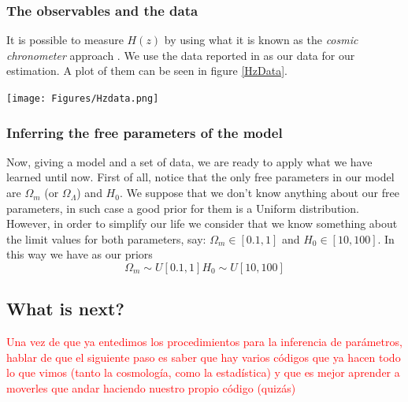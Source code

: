 \documentclass[onecolumn,           %
               showpacs,            %
               preprintnumbers,     %
               aps,                 %
               prl,          	    %
               letterpaper,             %
               superscriptaddress,      %
               nofootinbib,         %
               tightenlines,        %
               floats,floatfix      %
               ,usenatbib,
               ]{revtex4-1}
\begin{document}
\subsubsection{The observables and the data}

It is possible to measure $H(z)$ by using what it is known as the \textit{cosmic chronometer} approach \cite{Hz}. We use the data reported in \cite{Hzdata} as our data for our estimation. A plot of them can be seen in figure \ref{HzData}.

\begin{minipage}{\textwidth}
\centering
\texttt{[image: Figures/Hzdata.png]}
\label{HzData}
\end{minipage}

\subsubsection{Inferring the free parameters of the model}

Now, giving a model and a set of data, we are ready to apply what we have learned until now. First of all, notice that the only free parameters in our model are $\Omega_m$ (or $\Omega_\Lambda$) and $H_0$. We suppose that we don't know anything about our free parameters, in such case a good prior for them is a Uniform distribution. However, in order to simplify our life we consider that we know something about the limit values for both parameters,  say: $\Omega_m\in [0.1,1]$ and $H_0\in [10,100]$. In this way we have as our priors
\begin{subequations}
\begin{equation}
\Omega_m\sim U[0.1,1]
\end{equation}
\begin{equation}
H_0\sim U[10,100]
\end{equation}
\end{subequations} 
\subsection{What is next?}

\textcolor{red}{Una vez de que ya entedimos los procedimientos para la inferencia de par\'ametros, hablar de que el siguiente paso es saber que hay varios c\'odigos que ya hacen todo lo que vimos (tanto la cosmolog\'ia, como la estad\'istica) y que es mejor aprender a moverles que andar haciendo nuestro propio código (quiz\'as)}
\end{document}
